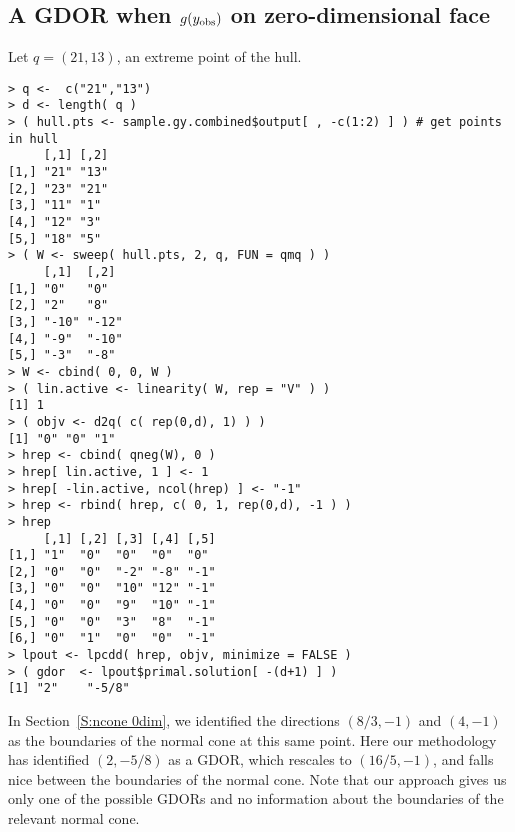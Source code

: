 \subsection{A GDOR when $g(y_{\text{obs}})$ on zero-dimensional face} \label{S:GDOR 0dim}
Let $q = (21,13)$, an extreme point of the hull.
\begin{verbatim}
> q <-  c("21","13")
> d <- length( q )
> ( hull.pts <- sample.gy.combined$output[ , -c(1:2) ] ) # get points in hull
     [,1] [,2]
[1,] "21" "13"
[2,] "23" "21"
[3,] "11" "1" 
[4,] "12" "3" 
[5,] "18" "5" 
> ( W <- sweep( hull.pts, 2, q, FUN = qmq ) )
     [,1]  [,2] 
[1,] "0"   "0"  
[2,] "2"   "8"  
[3,] "-10" "-12"
[4,] "-9"  "-10"
[5,] "-3"  "-8" 
> W <- cbind( 0, 0, W )
> ( lin.active <- linearity( W, rep = "V" ) )
[1] 1
> ( objv <- d2q( c( rep(0,d), 1) ) )
[1] "0" "0" "1"
> hrep <- cbind( qneg(W), 0 ) 
> hrep[ lin.active, 1 ] <- 1
> hrep[ -lin.active, ncol(hrep) ] <- "-1"
> hrep <- rbind( hrep, c( 0, 1, rep(0,d), -1 ) )
> hrep
     [,1] [,2] [,3] [,4] [,5]
[1,] "1"  "0"  "0"  "0"  "0" 
[2,] "0"  "0"  "-2" "-8" "-1"
[3,] "0"  "0"  "10" "12" "-1"
[4,] "0"  "0"  "9"  "10" "-1"
[5,] "0"  "0"  "3"  "8"  "-1"
[6,] "0"  "1"  "0"  "0"  "-1"
> lpout <- lpcdd( hrep, objv, minimize = FALSE )
> ( gdor  <- lpout$primal.solution[ -(d+1) ] )
[1] "2"    "-5/8"
\end{verbatim}
In Section~\ref{S:ncone 0dim}, we identified the directions $(8/3, -1)$ and $(4,-1)$ 
as the boundaries of the normal cone at this same point.  Here our methodology
has identified $(2, -5/8)$ as a GDOR, which rescales to $(16/5,-1)$, and falls
nice between the boundaries of the normal cone.  Note that our approach gives us 
only one of the possible GDORs and no information about the boundaries of the relevant
normal cone.

